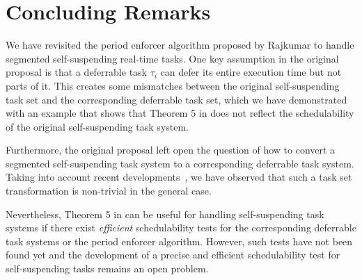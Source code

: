 
\section{Concluding Remarks}

We have revisited the period enforcer algorithm proposed by Rajkumar \cite{Raj:suspension1991} to handle segmented self-suspending real-time tasks. One key assumption in the original proposal \cite{Raj:suspension1991} is that a deferrable task $\tau_i$ can defer its entire execution time but not parts of it. This creates some mismatches between the original self-suspending task set and the corresponding deferrable task set, which we have demonstrated with an example that shows that Theorem 5 in \cite{Raj:suspension1991} does not reflect the schedulability of the original self-suspending task system. 


Furthermore, the original proposal \cite{Raj:suspension1991} left open the question of how to convert a segmented self-suspending task system to a corresponding deferrable task system. Taking into account recent developments~\cite{ecrts15nelissen}, we have observed that such a task set transformation is non-trivial in the general case.  


Nevertheless, Theorem 5 in \cite{Raj:suspension1991} can be useful for handling self-suspending task systems if there exist \emph{efficient} schedulability tests for the corresponding deferrable task systems or the period enforcer algorithm. However, such tests have not been found yet and the development of a precise and efficient schedulability test for self-suspending tasks remains an open problem.

